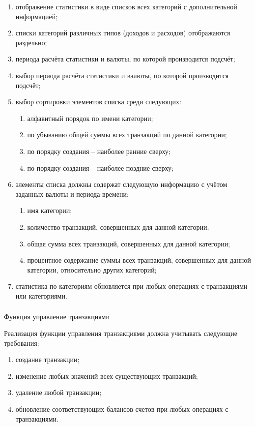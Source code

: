 \begin{enumerate}
    \item отображение статистики в виде списков всех категорий с дополнительной информацией;
    \item списки категорий различных типов (доходов и расходов) отображаются раздельно;
    \item периода расчёта статистики и валюты, по которой производится подсчёт;
    \item выбор периода расчёта статистики и валюты, по которой производится подсчёт;
    \item выбор сортировки элементов списка среди следующих:
    \begin{enumerate}
        \item алфавитный порядок по имени категории;
        \item по убыванию общей суммы всех транзакций по данной категории;
        \item по порядку создания -- наиболее ранние сверху;
        \item по порядку создания -- наиболее поздние сверху;
    \end{enumerate}
    \item элементы списка должны содержат следующую информацию с учётом заданных валюты и периода времени:
    \begin{enumerate}
        \item имя категории;
        \item количество транзакций, совершенных для данной категории;
        \item общая сумма всех транзакций, совершенных для данной категории;
        \item процентное содержание суммы всех транзакций, совершенных для данной категории, относительно других категорий;
    \end{enumerate}
    \item статистика по категориям обновляется при любых операциях с транзакциями или категориями.
\end{enumerate}

\subsubsection{} Функция управление транзакциями
\label{sec:domain:specification:transactions}

Реализация функции управления транзакциями должна учитывать следующие требования:

\begin{enumerate}
    \item создание транзакции;
    \item изменение любых значений всех существующих транзакций;
    \item удаление любой транзакции;
    \item обновление соответствующих балансов счетов при любых операциях с транзакциями.
\end{enumerate}

